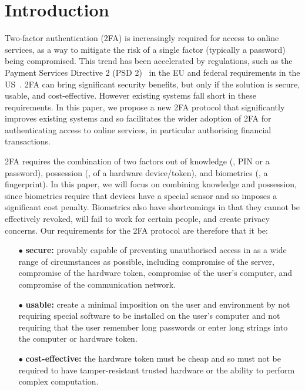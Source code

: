 


\section{Introduction}

Two-factor authentication (2FA) is increasingly required for access to online services, as a way to mitigate the risk of a single factor (typically a password) being compromised.
This trend has been accelerated by regulations, such as the Payment Services Directive 2 (PSD 2)~\cite{psd2} in the EU and federal requirements in the US~\cite{Zero-Trust-Cybersecurity}.
2FA can bring significant security benefits, but only if the solution is secure, usable, and cost-effective.
However existing systems fall short in these requirements.
In this paper, we propose a new 2FA protocol that significantly improves existing systems and so facilitates the wider adoption of 2FA for authenticating access to online services, in particular authorising financial transactions.

2FA requires the combination of two factors out of knowledge (\eg, PIN or a password), possession (\eg, of a hardware device/token), and biometrics (\eg, a fingerprint).
In this paper, we will focus on combining knowledge and possession, since biometrics require that devices have a special sensor and so imposes a significant cost penalty.
Biometrics also have shortcomings in that they cannot be effectively revoked, will fail to work for certain people, and create privacy concerns. Our requirements for the 2FA protocol are therefore that it be:%

\begin{itemize}
\item[$\bullet$]\textbf{secure:} provably capable of preventing unauthorised access in as a wide range of circumstances as possible, including compromise of the server, compromise of the hardware token, compromise of the user's computer, and compromise of the communication network.

\item[$\bullet$]\textbf{usable:} create a minimal imposition on the user and environment by not requiring special software to be installed on the user's computer and not requiring that the user remember long passwords or enter long strings into the computer or hardware token.

\item[$\bullet$]\textbf{cost-effective:} the hardware token must be cheap and so must not be required to have tamper-resistant trusted hardware or the ability to perform complex computation.
\end{itemize}

